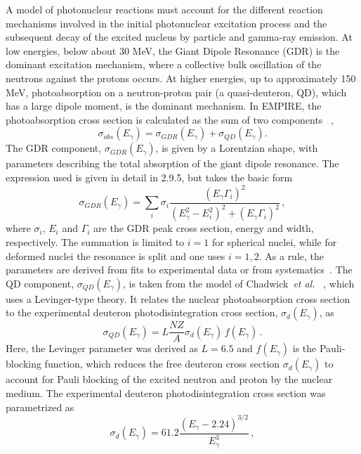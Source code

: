 A model of photonuclear reactions must account for the different reaction
mechanisms involved in the initial photonuclear excitation process and the
subsequent decay of the excited nucleus by particle and gamma-ray emission.
At low energies, below about 30 MeV, the Giant Dipole Resonance (GDR) is the
dominant excitation mechanism, where a collective bulk oscillation of the
neutrons against the protons occurs. At higher energies, up to approximately
150 MeV, photoabsorption on a neutron-proton pair (a quasi-deuteron, QD),
which has a large dipole moment, is the dominant mechanism. In EMPIRE, the
photoabsorption cross section is calculated as the sum of two components~%
\cite{PHNuc},
\begin{equation}
\sigma_{abs}(E_{\gamma})=\sigma_{GDR}(E_{\gamma})+\sigma_{QD}(E_{\gamma}).
\end{equation}
The GDR component, $\sigma_{GDR}(E_{\gamma})$, is given by a Lorentzian
shape, with parameters describing the total absorption of the giant dipole
resonance. The expression used is given in detail in 2.9.5, but takes the
basic form
\begin{equation}
\sigma_{GDR}(E_{\gamma})=\sum_{i}\sigma_{i}%
\frac{(E_{\gamma}\Gamma_{i})^{2}}{(E_{\gamma}^{2}-E_{i}^{2})^{2}+(E_{\gamma}%
\Gamma_{i})^{2}}\,,
\end{equation}
\noindent where $\sigma_{i}$, $E_{i}$ and $\Gamma_{i}$ are the GDR peak
cross section, energy and width, respectively. The summation is limited to $%
i=1$ for spherical nuclei, while for deformed nuclei the resonance is split
and one uses $i=1,2$. As a rule, the parameters are derived from fits to
experimental data or from systematics~\cite{RIPL2}. The QD component, $%
\sigma_{QD}(E_{\gamma})$, is taken from the model of Chadwick~\emph{et al.}~%
\cite{chadQD}, which uses a Levinger-type theory. It relates the nuclear
photoabsorption cross section to the experimental deuteron
photodisintegration cross section, $\sigma_{d}(E_{\gamma})$, as
\begin{equation}
\sigma_{QD}(E_{\gamma})=L\frac{NZ}{A}\sigma_{d}(E_{\gamma})\,
f(E_{\gamma})\,.
\end{equation}
Here, the Levinger parameter was derived as $L=6.5$ and $f(E_{\gamma})$ is
the Pauli-blocking function, which reduces the free deuteron cross section $%
\sigma_{d}(E_{\gamma})$ to account for Pauli blocking of the excited neutron
and proton by the nuclear medium. The experimental deuteron
photodisintegration cross section was parametrized as
\begin{equation}
\sigma_{d}(E_{\gamma})=61.2\frac{(E_{\gamma}-2.24)^{3/2}}{E_{\gamma}^{3}}\,,
\end{equation}
